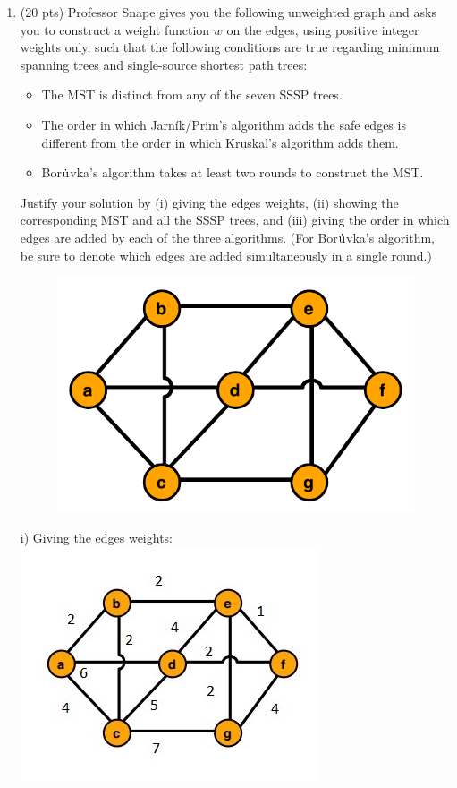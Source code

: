 \documentclass[12pt]{article}
\begin{document}
\begin{enumerate}
	\item \label{3} (20 pts) Professor Snape gives you the following unweighted graph and asks you to construct a weight function $w$ on the edges, using positive integer weights only, such that the following conditions are true regarding minimum spanning trees and single-source shortest path trees:
	\begin{itemize}
	\itemsep-0.1pt
	\item The MST is distinct from any of the seven SSSP trees.
	\item The order in which Jarn\'ik/Prim's algorithm adds the safe edges is different from the order in which Kruskal's algorithm adds them.
	\item Bor$\rm{\dot{u}}$vka's algorithm takes at least two rounds to construct the MST.
	\end{itemize}
	Justify your solution by (i) giving the edges weights, (ii) showing the corresponding MST and all the SSSP trees, and (iii) giving the order in which edges are added by each of the three algorithms. (For Bor$\rm{\dot{u}}$vka's algorithm, be sure to denote which edges are added simultaneously in a single round.)

\begin{figure}[h!]
\begin{center}
\includegraphics[scale=0.7]{graph_mst.pdf} 
\end{center}
\end{figure}

i) Giving the edges weights: \\
\includegraphics[scale=0.7]{snapegraph.jpg} 


\end{enumerate}
\end{document}
